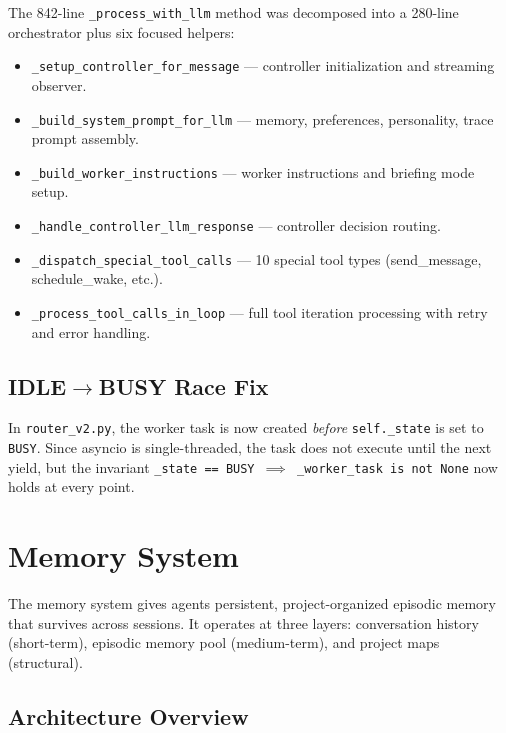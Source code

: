 \documentclass[11pt,a4paper]{article}
\newcommand{\code}[1]{\texttt{#1}}
\begin{document}
The 842-line \code{\_process\_with\_llm} method was decomposed into a
280-line orchestrator plus six focused helpers:

\begin{itemize}[nosep]
  \item \code{\_setup\_controller\_for\_message} --- controller
        initialization and streaming observer.
  \item \code{\_build\_system\_prompt\_for\_llm} --- memory, preferences,
        personality, trace prompt assembly.
  \item \code{\_build\_worker\_instructions} --- worker instructions and
        briefing mode setup.
  \item \code{\_handle\_controller\_llm\_response} --- controller
        decision routing.
  \item \code{\_dispatch\_special\_tool\_calls} --- 10 special tool types
        (send\_message, schedule\_wake, etc.).
  \item \code{\_process\_tool\_calls\_in\_loop} --- full tool iteration
        processing with retry and error handling.
\end{itemize}

\subsection{IDLE$\to$BUSY Race Fix}

In \code{router\_v2.py}, the worker task is now created
\emph{before} \code{self.\_state} is set to \code{BUSY}. Since asyncio
is single-threaded, the task does not execute until the next yield, but
the invariant \code{\_state == BUSY $\implies$ \_worker\_task is not
None} now holds at every point.

\section{Memory System}
\label{sec:memory}

The memory system gives agents persistent, project-organized episodic
memory that survives across sessions. It operates at three layers:
conversation history (short-term), episodic memory pool (medium-term),
and project maps (structural).

\subsection{Architecture Overview}
\end{document}
